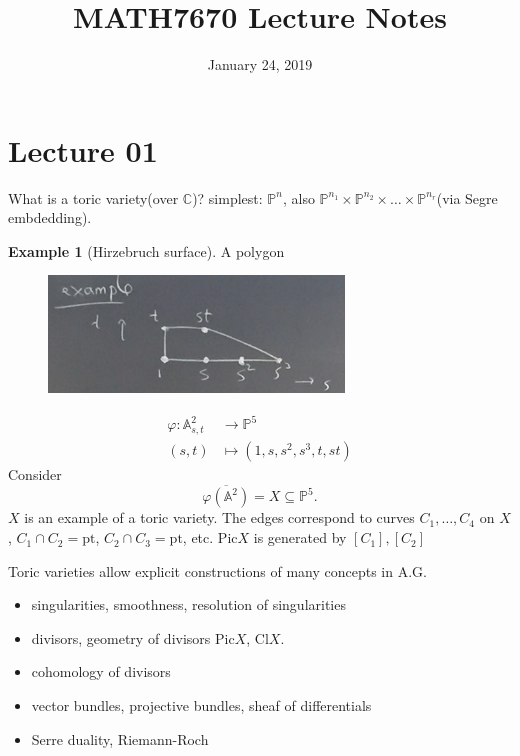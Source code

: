 \documentclass[a4paper,12pt]{amsart}
\title{MATH7670 Lecture Notes}
\author{}
\date{January 24, 2019}
\newcommand{\CC}{\mathbb{C}}
\newcommand{\PP}{\mathbb{P}}
\begin{document}
\maketitle
\newtheorem{Lemma}{Lemma}
\newtheorem{Proposition}{Proposition}[section]
\newtheorem{Theorem}{Theorem}[section]
\newtheorem{Corollary}{Corollary}
\newtheorem*{Conjecture}{Conjecture}

\theoremstyle{definition}
\newtheorem*{Problem}{Problem}
\newtheorem*{Def}{Definition}
\newtheorem{Eg}{Example}

\theoremstyle{remark}
\newtheorem*{Remark}{Remark}
\newtheorem*{Caution}{\bf{Caution}}
\newtheorem*{Fact}{Fact}


\section{Lecture 01}

What is a toric variety(over $\CC$)? simplest: $\PP^n$, also $\PP^{n_1}\times\PP^{n_2}\times\dots\times\PP^{n_r}$(via Segre embdedding).

\begin{Eg}[Hirzebruch surface]
A polygon
\begin{figure}[h]
\centering
\includegraphics[width=0.7\textwidth]{pic/lec01pic01}
\end{figure}
\begin{align*}
\varphi:\mathbb{A}^2_{s,t}&\rightarrow\PP^5\\
(s,t)&\mapsto(1,s,s^2,s^3,t,st)
\end{align*}
Consider
\begin{equation*}
\overline{\varphi(\mathbb{A}^2)}=X\subseteq\PP^5.
\end{equation*}
$X$ is an example of a toric variety.
The edges correspond to curves $C_1,\dots,C_4$ on $X$, $C_1\cap C_2=\text{pt}$, $C_2\cap C_3=\text{pt}$, etc. $\text{Pic}X$ is generated by $[C_1],[C_2]$
\end{Eg}
Toric varieties allow explicit constructions of many concepts in A.G.
\begin{itemize}
\item singularities, smoothness, resolution of singularities 
\item divisors, geometry of divisors $\text{Pic}X$, $\text{Cl}X$.
\item cohomology of divisors
\item vector bundles, projective bundles, sheaf of differentials
\item  Serre duality, Riemann-Roch
\end{itemize}
\end{document}
